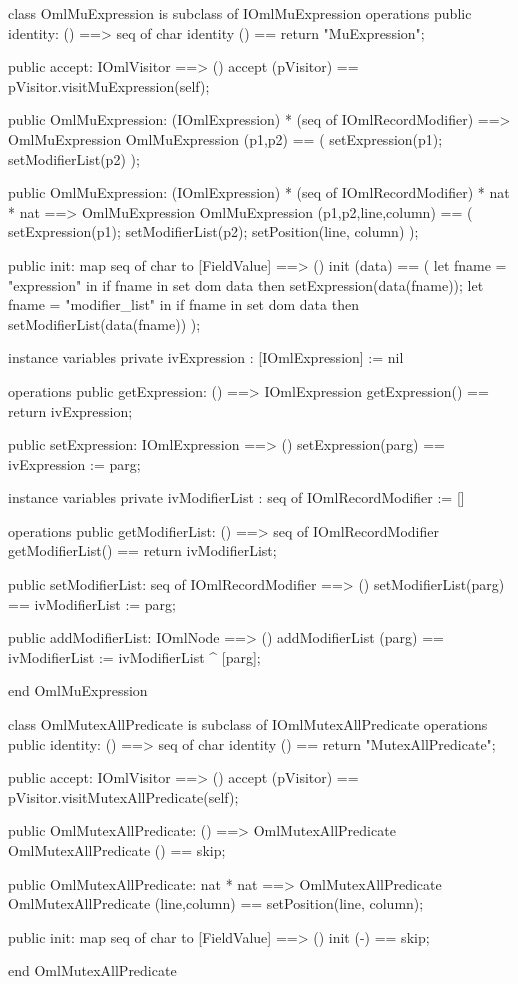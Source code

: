 \begin{vdm_al}
class OmlMuExpression is subclass of IOmlMuExpression
operations
  public identity: () ==> seq of char
  identity () == return "MuExpression";

  public accept: IOmlVisitor ==> ()
  accept (pVisitor) == pVisitor.visitMuExpression(self);

  public OmlMuExpression:
    (IOmlExpression) *
    (seq of IOmlRecordModifier) ==> OmlMuExpression
  OmlMuExpression (p1,p2) == 
    ( setExpression(p1);
      setModifierList(p2) );

  public OmlMuExpression:
    (IOmlExpression) *
    (seq of IOmlRecordModifier) *
    nat *
    nat ==> OmlMuExpression
  OmlMuExpression (p1,p2,line,column) == 
    ( setExpression(p1);
      setModifierList(p2);
      setPosition(line, column) );

  public init: map seq of char to [FieldValue] ==> ()
  init (data) ==
    ( let fname = "expression" in
        if fname in set dom data
        then setExpression(data(fname));
      let fname = "modifier_list" in
        if fname in set dom data
        then setModifierList(data(fname)) );

instance variables
  private ivExpression : [IOmlExpression] := nil

operations
  public getExpression: () ==> IOmlExpression
  getExpression() == return ivExpression;

  public setExpression: IOmlExpression ==> ()
  setExpression(parg) == ivExpression := parg;

instance variables
  private ivModifierList : seq of IOmlRecordModifier := []

operations
  public getModifierList: () ==> seq of IOmlRecordModifier
  getModifierList() == return ivModifierList;

  public setModifierList: seq of IOmlRecordModifier ==> ()
  setModifierList(parg) == ivModifierList := parg;

  public addModifierList: IOmlNode ==> ()
  addModifierList (parg) == ivModifierList := ivModifierList ^ [parg];

end OmlMuExpression
\end{vdm_al}

\begin{vdm_al}
class OmlMutexAllPredicate is subclass of IOmlMutexAllPredicate
operations
  public identity: () ==> seq of char
  identity () == return "MutexAllPredicate";

  public accept: IOmlVisitor ==> ()
  accept (pVisitor) == pVisitor.visitMutexAllPredicate(self);

  public OmlMutexAllPredicate:
    () ==> OmlMutexAllPredicate
  OmlMutexAllPredicate () == 
    skip;

  public OmlMutexAllPredicate:
    nat *
    nat ==> OmlMutexAllPredicate
  OmlMutexAllPredicate (line,column) == 
    setPosition(line, column);

  public init: map seq of char to [FieldValue] ==> ()
  init (-) == skip;

end OmlMutexAllPredicate
\end{vdm_al}

